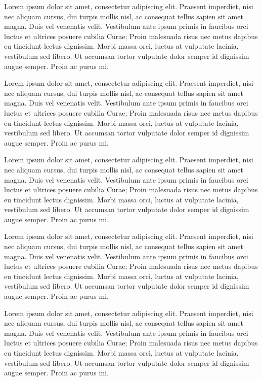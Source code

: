 Lorem ipsum dolor sit amet, consectetur adipiscing elit. Praesent imperdiet, nisi 
nec aliquam cursus, dui turpis mollis nisl, ac consequat tellus sapien sit amet 
magna. Duis vel venenatis velit. Vestibulum ante ipsum primis in faucibus orci 
luctus et ultrices posuere cubilia Curae; Proin malesuada risus nec metus dapibus 
eu tincidunt lectus dignissim. Morbi massa orci, luctus at vulputate lacinia, 
vestibulum sed libero. Ut accumsan tortor vulputate dolor semper id dignissim 
augue semper. Proin ac purus mi. 

Lorem ipsum dolor sit amet, consectetur adipiscing elit. Praesent imperdiet, nisi 
nec aliquam cursus, dui turpis mollis nisl, ac consequat tellus sapien sit amet 
magna. Duis vel venenatis velit. Vestibulum ante ipsum primis in faucibus orci 
luctus et ultrices posuere cubilia Curae; Proin malesuada risus nec metus dapibus 
eu tincidunt lectus dignissim. Morbi massa orci, luctus at vulputate lacinia, 
vestibulum sed libero. Ut accumsan tortor vulputate dolor semper id dignissim 
augue semper. Proin ac purus mi. 

Lorem ipsum dolor sit amet, consectetur adipiscing elit. Praesent imperdiet, nisi 
nec aliquam cursus, dui turpis mollis nisl, ac consequat tellus sapien sit amet 
magna. Duis vel venenatis velit. Vestibulum ante ipsum primis in faucibus orci 
luctus et ultrices posuere cubilia Curae; Proin malesuada risus nec metus dapibus 
eu tincidunt lectus dignissim. Morbi massa orci, luctus at vulputate lacinia, 
vestibulum sed libero. Ut accumsan tortor vulputate dolor semper id dignissim 
augue semper. Proin ac purus mi. 

Lorem ipsum dolor sit amet, consectetur adipiscing elit. Praesent imperdiet, nisi 
nec aliquam cursus, dui turpis mollis nisl, ac consequat tellus sapien sit amet 
magna. Duis vel venenatis velit. Vestibulum ante ipsum primis in faucibus orci 
luctus et ultrices posuere cubilia Curae; Proin malesuada risus nec metus dapibus 
eu tincidunt lectus dignissim. Morbi massa orci, luctus at vulputate lacinia, 
vestibulum sed libero. Ut accumsan tortor vulputate dolor semper id dignissim 
augue semper. Proin ac purus mi. 

Lorem ipsum dolor sit amet, consectetur adipiscing elit. Praesent imperdiet, nisi 
nec aliquam cursus, dui turpis mollis nisl, ac consequat tellus sapien sit amet 
magna. Duis vel venenatis velit. Vestibulum ante ipsum primis in faucibus orci 
luctus et ultrices posuere cubilia Curae; Proin malesuada risus nec metus dapibus 
eu tincidunt lectus dignissim. Morbi massa orci, luctus at vulputate lacinia, 
vestibulum sed libero. Ut accumsan tortor vulputate dolor semper id dignissim 
augue semper. Proin ac purus mi. 
